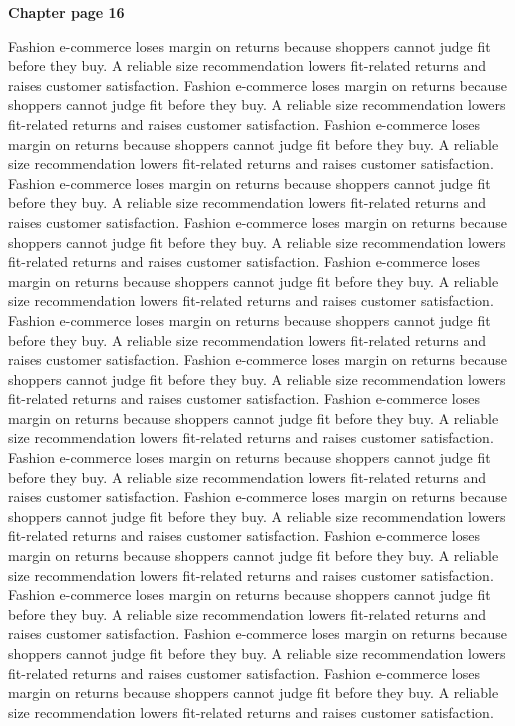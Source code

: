 \documentclass[a4paper,11pt]{article}
\begin{document}
{\headfont\bfseries\Large Chapter page 16}\par\medskip
Fashion e-commerce loses margin on returns because shoppers cannot judge fit before they buy. A reliable size recommendation lowers fit-related returns and raises customer satisfaction. Fashion e-commerce loses margin on returns because shoppers cannot judge fit before they buy. A reliable size recommendation lowers fit-related returns and raises customer satisfaction. Fashion e-commerce loses margin on returns because shoppers cannot judge fit before they buy. A reliable size recommendation lowers fit-related returns and raises customer satisfaction. Fashion e-commerce loses margin on returns because shoppers cannot judge fit before they buy. A reliable size recommendation lowers fit-related returns and raises customer satisfaction. Fashion e-commerce loses margin on returns because shoppers cannot judge fit before they buy. A reliable size recommendation lowers fit-related returns and raises customer satisfaction. 
Fashion e-commerce loses margin on returns because shoppers cannot judge fit before they buy. A reliable size recommendation lowers fit-related returns and raises customer satisfaction. Fashion e-commerce loses margin on returns because shoppers cannot judge fit before they buy. A reliable size recommendation lowers fit-related returns and raises customer satisfaction. Fashion e-commerce loses margin on returns because shoppers cannot judge fit before they buy. A reliable size recommendation lowers fit-related returns and raises customer satisfaction. Fashion e-commerce loses margin on returns because shoppers cannot judge fit before they buy. A reliable size recommendation lowers fit-related returns and raises customer satisfaction. Fashion e-commerce loses margin on returns because shoppers cannot judge fit before they buy. A reliable size recommendation lowers fit-related returns and raises customer satisfaction. 
Fashion e-commerce loses margin on returns because shoppers cannot judge fit before they buy. A reliable size recommendation lowers fit-related returns and raises customer satisfaction. Fashion e-commerce loses margin on returns because shoppers cannot judge fit before they buy. A reliable size recommendation lowers fit-related returns and raises customer satisfaction. Fashion e-commerce loses margin on returns because shoppers cannot judge fit before they buy. A reliable size recommendation lowers fit-related returns and raises customer satisfaction. Fashion e-commerce loses margin on returns because shoppers cannot judge fit before they buy. A reliable size recommendation lowers fit-related returns and raises customer satisfaction. Fashion e-commerce loses margin on returns because shoppers cannot judge fit before they buy. A reliable size recommendation lowers fit-related returns and raises customer satisfaction. \newpage
\end{document}
